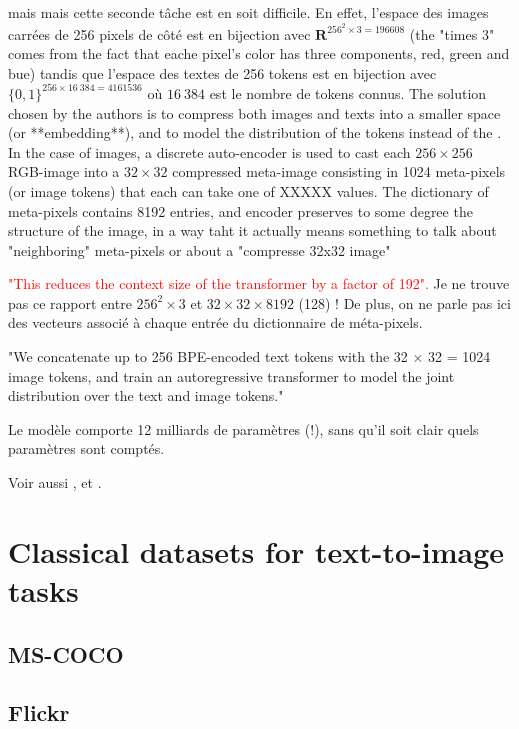 \documentclass{article}
\begin{document}
\begin{appendix}
mais mais cette seconde tâche est en soit difficile. En effet, l'espace des images carrées de 256 pixels de côté est en bijection avec $\mathbf{R}^{256^2\times 3 = 196608}$ (the "times 3" comes from the fact that eache pixel's color has three components, red, green and bue) tandis que l'espace des textes de 256 tokens est en bijection avec $\{0,1\}^{256\times16~384 = 4161536}$ où $16~384$ est le nombre de tokens connus.
The solution chosen by the authors is to compress both images and texts into a smaller space (or **embedding**), and to model the distribution of the tokens instead of the .
In the case of images, a discrete auto-encoder is used to cast each $256 \times 256$ RGB-image into a $32 \times 32$ compressed meta-image consisting in 1024 meta-pixels (or image tokens) that each can take one of XXXXX values.
The dictionary of meta-pixels contains 8192 entries, and encoder preserves to some degree the structure of the image, in a way taht it actually means something to talk about "neighboring" meta-pixels or about a "compresse 32x32 image"

\textcolor{red}{"This reduces the context size of the transformer by a factor of 192".} Je ne trouve pas ce rapport entre $256^2\times 3$ et $32\times32\times8192$ (128) ! De plus, on ne parle pas ici des vecteurs associé à chaque entrée du dictionnaire de méta-pixels.

"We concatenate up to 256 BPE-encoded text tokens with the 32 × 32 = 1024 image tokens, and train an autoregressive transformer to model the joint distribution over the text and image tokens."

Le modèle comporte 12 milliards de paramètres (!), sans qu'il soit clair quels paramètres sont comptés.

Voir aussi \cite{neural-discrete}, \cite{high-fi-with-vqvae2} et \cite{subword-units}.

\section{Classical datasets for text-to-image tasks}

\subsection{MS-COCO}

\subsection{Flickr}


\end{appendix}
\end{document}
